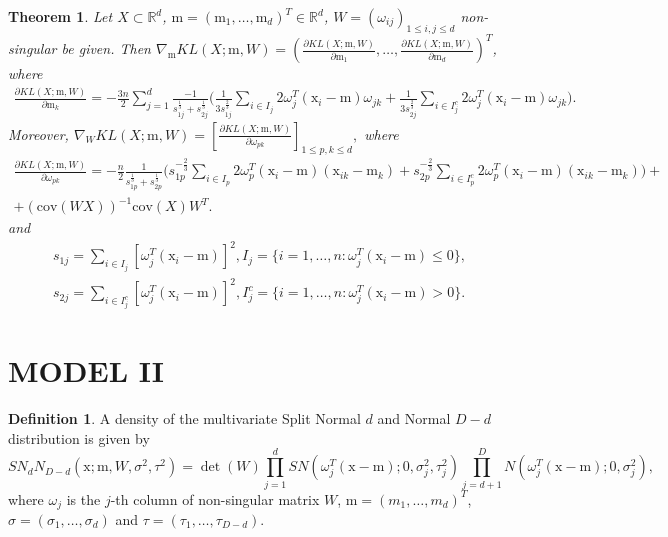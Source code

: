 \documentclass[12pt]{article}
\def\R{\mathbb{R}}
\def\w{\omega}
\def\x{\mathrm{x}}
\def\m{\mathrm{m}}
\def\cov{\mathrm{cov}}
\newtheorem{theorem}{Theorem}[section]
\theoremstyle{definition}
\newtheorem{definition}{Definition}[section]
\begin{document}
\begin{theorem}
Let $X \subset \R^d$, $\m = (\m_1, \ldots, \m_d)^T \in \R^d$, $W = (\w_{ij})_{1 \leq i,j \leq d}$ non-singular be given. 
Then
$\nabla_{\m}  KL(X;\m,W) = \left(  \frac{\partial KL(X;\m,W)}{\partial \m_1}, \ldots, \frac{\partial KL(X;\m,W)}{\partial \m_d} \right)^T$,
where
$$
\begin{array}{l}
\frac{\partial KL(X;\m,W)}{\partial \m_k} =
-\frac{3n}{2}\sum \limits_{j=1}^d \frac{-1}{{s}_{1j}^{\frac{1}{3}} + {s}_{2j}^{\frac{1}{3}}} \bigg(
\frac{1}{3 {s}_{1j}^{\frac{2}{3}}} \sum \limits_{i \in I_j} 2 \w_j^T (\x_i - \m)  \w_{jk} + %
\frac{1}{3 {s}_{2j}^{\frac{2}{3}}} \sum \limits_{i \in I_j^c} 2 \w_j^T (\x_i - \m)  \w_{jk}
\bigg).
\end{array}
$$
Moreover,
$
\nabla_{W} KL(X;\m,W) = \left[ \frac{\partial KL(X;\m,W)}{\partial \w_{pk}}  \right]_{1 \leq p,k \leq d},
$
where
$$
\begin{array}{l}
\frac{\partial KL(X;\m,W)}{\partial \w_{pk}}  = 
-\frac{n}{2}\frac{1}{{s}_{1p}^{\frac{1}{3}} +{s}_{2p}^{\frac{1}{3}}} 
\bigg(
 {s}_{1p}^{-\frac{2}{3}}  \sum \limits_{i \in {I}_p} 2 \w^T_p  (\x_i - \m) (\x_{ik} - \m_k) +
 {s}_{2p}^{-\frac{2}{3}}  \sum \limits_{i \in {I}_p^c} 2 \w^T_p  (\x_i - \m) (\x_{ik} - \m_k) \bigg) +\\[6pt]
+ (\cov(WX))^{-1} \cov(X)W^T.
\end{array}
$$
and
$$
\begin{array}{c}
{s}_{1j}= \! \sum\limits_{i \in I_j}[ \w_{j}^T (\x_i-\m)]^2, {I}_j=\{ i = 1,\ldots,n \colon \w_{j}^T (\x_i-\m) \leq 0 \},
\\[1ex]
{s}_{2j}= \! \sum\limits_{i \in I_j^c}[ \w_{j}^T (\x_i-\m)]^2,  {I}_j^c=\{ i = 1,\ldots,n \colon  \w_{j}^T (\x_i-\m) > 0 \}.
\end{array}
$$
\end{theorem}

\section{MODEL II}

\begin{definition}\label{def:GSN}
A density of the multivariate Split Normal $d$ and Normal $D-d$ distribution is given by
$$
 SN_{d}N_{D-d}(\x; \m,W, \sigma^2,\tau^2)=\det(W) \prod_{j=1}^{d} SN(\w_j^T(\x-\m);0,\sigma_j^2,\tau_j^2)\prod_{j=d+1}^{D} N(\w_j^T(\x-\m);0,\sigma_j^2),
$$
where $\w_{j}$ is the $j$-th column of non-singular matrix $W$, $\m = (m_1, \ldots, m_d)^T$, $\sigma = (\sigma_{1},\ldots,\sigma_{d})$ and $\tau=(\tau_{1},\ldots,\tau_{D-d})$.
\end{definition}
\end{document}
